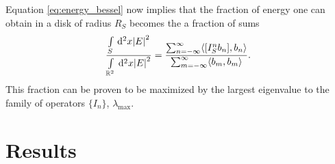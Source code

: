 \documentclass[11pt,a4paper, 
swedish,english %
]{article}
\begin{document}
Equation \eqref{eq:energy_bessel} now implies that the fraction of energy one can obtain in a disk of radius $R_S$ becomes the a fraction of sums
\begin{equation}
  \label{eq:energy_frac_bessel}
\frac{\int_S \id^2x \abs{E}^2}{\int_{\mathbb{R}^2} \id^2x \abs{E}^2}=\frac{\sum_{n=-\infty}^{\infty} \langle [I_S^nb_n],b_n \rangle}{\sum_{m=-\infty}^{\infty} \langle b_m,b_m \rangle}.
\end{equation}
This fraction can be proven to be maximized by the largest eigenvalue to the family of operators $\{I_n\}$, $\lambda_\text{max}$.
  





\section{Results}
\end{document}
